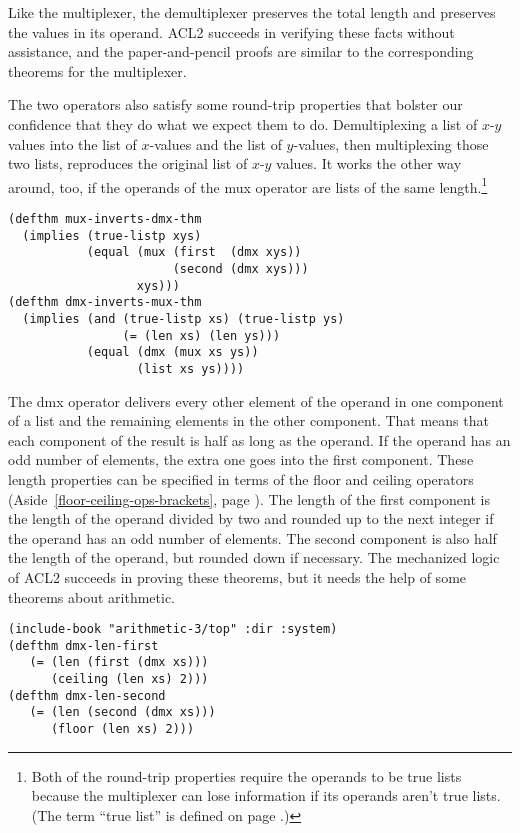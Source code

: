 Like the multiplexer,
the demultiplexer preserves the total length
and preserves the values in its operand.
ACL2 succeeds in verifying these facts without assistance,
and the paper-and-pencil proofs are similar to the corresponding
theorems for the multiplexer.

The two operators also satisfy some round-trip properties
that bolster our confidence that they do what we expect them to do.
Demultiplexing a list of $x$-$y$ values into the list of
$x$-values and the list of $y$-values, then multiplexing
those two lists, reproduces the original list of $x$-$y$ values.
It works the other way around, too, if the operands of
the \textsf{mux} operator are lists of the same length.\footnote{Both
of the round-trip properties require the operands to be
true lists because the multiplexer can lose information
if its operands aren't true lists.
(The term ``true list'' is defined on page \pageref{true-list-def}.)}

\label{thm:mux-inverts-dmx}\label{thm:dmx-inverts-mux}
\begin{Verbatim}
(defthm mux-inverts-dmx-thm
  (implies (true-listp xys)
           (equal (mux (first  (dmx xys))
                       (second (dmx xys)))
                  xys)))
(defthm dmx-inverts-mux-thm
  (implies (and (true-listp xs) (true-listp ys)
                (= (len xs) (len ys)))
           (equal (dmx (mux xs ys))
                  (list xs ys))))
\end{Verbatim}

The \textsf{dmx} operator delivers every other element of the operand in
one component of a list and the remaining elements in the other component.
That means that each component of the result is half as long as the operand.
If the operand has an odd number of elements, the extra one goes into the first component.
These length properties can be specified in terms of the \textsf{floor} and \textsf{ceiling}
operators (Aside~\ref{floor-ceiling-ops-brackets}, page \pageref{floor-ceiling-ops-brackets}).
The length of the first component is the length of the operand divided by two
and rounded up to the next integer if the operand has an odd number of elements.
The second component is also half the length of the operand, but rounded down if necessary.
The mechanized logic of ACL2 succeeds in proving these theorems,
but it needs the help of some theorems about arithmetic.

\label{thm:dmx-length-first-second}
\begin{Verbatim}
(include-book "arithmetic-3/top" :dir :system)
(defthm dmx-len-first
   (= (len (first (dmx xs)))
      (ceiling (len xs) 2)))
(defthm dmx-len-second
   (= (len (second (dmx xs)))
      (floor (len xs) 2)))
\end{Verbatim}


